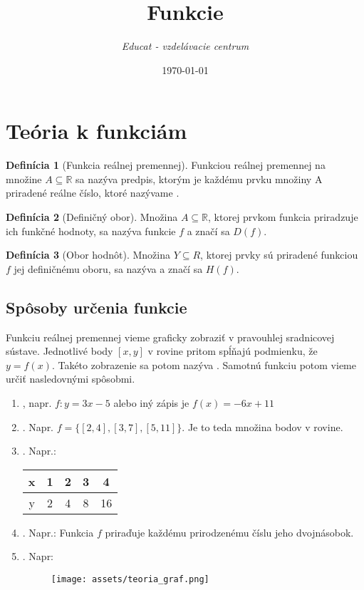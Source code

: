 \documentclass[12pt, twopage]{article}
\title{\textbf{Funkcie}}
\date{\today}
\author{\textit{Educat - vzdelávacie centrum}}
\theoremstyle{definition}
\newtheorem{definition}{Definícia}
\begin{document}
	\maketitle
	\tableofcontents
	
	
	\section{Teória k funkciám}
	\begin{definition}[Funkcia reálnej premennej]
		Funkciou reálnej premennej na množine $A \subseteq \mathbb{R}$ sa nazýva predpis, ktorým je každému prvku množiny A priradené  reálne číslo, ktoré nazývame .
	\end{definition}
	
	\begin{definition}[Definičný obor]
		Množina $A \subseteq \mathbb{R}$, ktorej prvkom funkcia priradzuje ich funkčné hodnoty, sa nazýva  funkcie $f$ a značí sa $D(f)$.
	\end{definition}
	
	\begin{definition}[Obor hodnôt]
		Množina $Y \subseteq R$, ktorej prvky sú priradené funkciou $f$ jej definičnému oboru, sa nazýva  a značí sa $H(f)$.
	\end{definition}
	
	\subsection{Spôsoby určenia funkcie}
	
	Funkciu reálnej premennej vieme graficky zobraziť v pravouhlej sradnicovej sústave. Jednotlivé body $[x, y]$ v rovine pritom spĺňajú podmienku, že $y = f(x)$. Takéto zobrazenie sa potom nazýva . Samotnú funkciu potom vieme určiť nasledovnými spôsobmi. 
	
	\begin{enumerate}
		\item {}, napr. $f: y = 3x - 5$ alebo iný zápis je $f(x) = -6x + 11$
		\item {}. Napr. $f = \{[2, 4], [3, 7], [5, 11]\}$. Je to teda množina bodov v rovine.
		\item {}. Napr.: \\
		\begin{tabular}{|c|c|c|c|c|}
			\hline
			x & 1 & 2 & 3 & 4 \\
			\hline
			y & 2 & 4 & 8 & 16\\
			\hline
		\end{tabular}
		\item {}. Napr.: Funkcia $f$ priraďuje každému prirodzenému číslu jeho dvojnásobok.
		\item {}. Napr:\\
		\begin{figure}[h]
			\texttt{[image: assets/teoria\_graf.png]}
		\end{figure}
	\end{enumerate}
	
\end{document}
